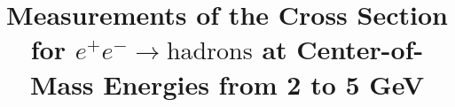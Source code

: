 
\newcommand{\jp}{J/\psi}
\newcommand{\etal}{\it et al.\rm}
\newcommand{\rt}{\rightarrow}
\def\Journal#1#2#3#4{{#1} {\bf #2}, #3 (#4)}

\def\NCA{\em Nuovo Cimento}
\def\NIM{\em Nucl. Instrum. Methods}
\def\NIMA{{\em Nucl. Instrum. Methods} A}
\def\NPB{{\em Nucl. Phys.} B}
\def\PLB{{\em Phys. Lett.}  B}
\def\PRL{\em Phys. Rev. Lett.}
\def\PRD{{\em Phys. Rev.} D}
\def\ZPC{{\em Z. Phys.} C}
\def\SNJP{\em Sov. J. Nucl. Phys.}
\def\NPA{{\em Nucl. Phys.} A}

\long{}


\title{\boldmath Measurements of the Cross Section for $e^+e^-\rt
\mbox{hadrons}$ at Center-of-Mass Energies from 2 to 5 GeV}

